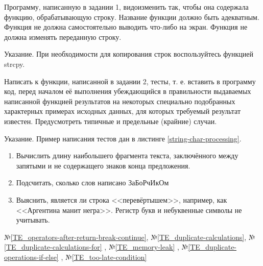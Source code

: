 \labtask

Программу, написанную в задании 1, видоизменить так, чтобы она содержала функцию, обрабатывающую строку.
Название функции должно быть адекватным.
Функция не должна самостоятельно выводить что-либо на экран.
Функция не должна изменять переданную строку.

Указание. При необходимости для копирования строк воспользуйтесь функцией strcpy.

\labtask

Написать к функции, написанной в задании 2, тесты,
т. е. вставить в программу код, перед началом её выполнения убеждающийся в правильности выдаваемых написанной функцией результатов
на некоторых специально подобранных характерных примерах исходных данных,
для которых требуемый результат известен.
Предусмотреть типичные и предельные (крайние) случаи.

Указание. Пример написания тестов дан в листинге \ref{string-char-processing}.

\reservedtasks

\begin{enumerate}
	\item
		Вычислить длину наибольшего фрагмента текста, заключённого между запятыми и не содержащего знаков конца предложения.
	\item
		Подсчитать, сколько слов написано ЗаБоРчИкОм
	\item
		Выяснить, является ли строка <<перевёртышем>>, например, как <<Аргентина манит негра>>.
		Регистр букв и небуквенные символы не учитывать.
\end{enumerate}

\typerrors
№\ref{TE_operators-after-return-break-continue},
№\ref{TE_duplicate-calculations},
№\ref{TE_duplicate-calculations-for}%
, №\ref{TE_memory-leak}%
, №\ref{TE_duplicate-operations-if-else}%
, №\ref{TE_too-late-condition}%

